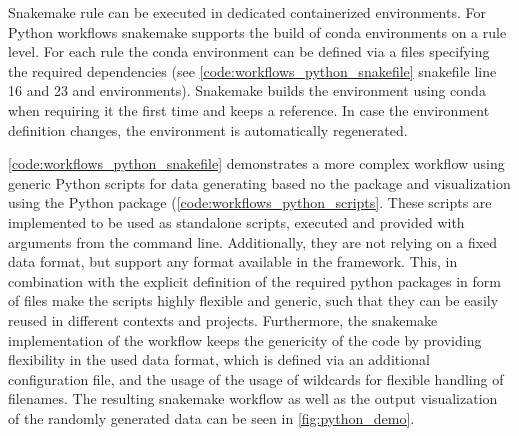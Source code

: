 Snakemake rule can be executed in dedicated containerized environments. For Python workflows snakemake supports the build of conda environments on a rule level. For each rule the conda environment can be defined via a  files specifying the required dependencies (see \cref{code:workflows_python_snakefile} snakefile line 16 and 23 and environments). Snakemake builds the environment using conda when requiring it the first time and keeps a reference. In case the  environment definition changes, the environment is automatically regenerated.

\cref{code:workflows_python_snakefile} demonstrates a more complex workflow using generic Python scripts for data generating based no the  package and visualization using the Python  package (\cref{code:workflows_python_scripts}. These scripts are implemented to be used as standalone scripts, executed and provided with arguments from the command line. Additionally, they are not relying on a fixed data format, but support any format available in the  framework. This, in combination with the explicit definition of the required python packages in form of  files make the scripts highly flexible and generic, such that they can be easily reused in different contexts and projects. Furthermore, the snakemake implementation of the workflow keeps the genericity of the code by providing flexibility in the used data format, which is defined via an additional configuration  file, and the usage of the usage of wildcards for flexible handling of filenames. The resulting snakemake workflow as well as the output visualization of the randomly generated data can be seen in \cref{fig:python_demo}.




